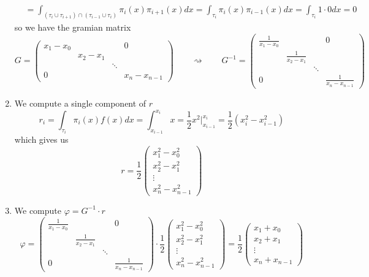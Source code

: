 \begin{enumerate}
\begin{equation*}
\begin{split}
                                           & = \int_{(\tau_i \cup \tau_{i+1}) \cap (\tau_{i-1} \cup \tau_{i})} \pi_i(x) \pi_{i+1}(x)dx = \int_{\tau_i} \pi_i(x) \pi_{i-1}(x) dx = \int_{\tau_i} 1 \cdot 0 dx = 0
         \end{split}
      \end{equation*}
      so we have the gramian matrix
      \[G = \begin{pmatrix} x_1 - x_0 & & & 0\\ & x_2 - x_1 & & \\ & & \ddots  & \\ 0 & & & x_n - x_{n-1}\end{pmatrix} \qquad\rightsquigarrow\qquad G^{-1} = \begin{pmatrix}\frac{1}{x_1 - x_0} & & & 0\\ & \frac{1}{x_2 - x_1} & & \\ & & \ddots & \\0 & & & \frac{1}{x_n - x_{n-1}} \end{pmatrix}\]
   \item We compute a single component of \(r\)
      \[r_i = \int_{\tau_i} \pi_i(x)f(x)dx = \int_{x_{i-1}}^{x_i} x = \frac{1}{2}x^2\rvert_{x_{i-1}}^{x_i} = \frac{1}{2}(x_i^2 - x_{i-1}^2)\]
      which gives us
      \[r = \frac{1}{2}\begin{pmatrix}x_1^2 - x_0^2\\x_2^2-x_1^2\\\vdots\\x_n^2 - x_{n-1}^2\end{pmatrix}\]
   \item We compute \(\varphi = G^{-1} \cdot r\)
      \[\varphi = \begin{pmatrix}\frac{1}{x_1 - x_0} & & & 0\\ & \frac{1}{x_2 - x_1} & & \\ & & \ddots & \\0 & & & \frac{1}{x_n - x_{n-1}} \end{pmatrix}
    \cdot \frac{1}{2} \begin{pmatrix}x_1^2 - x_0^2\\x_2^2 - x_1^2\\\vdots \\x_n^2 - x_{n-1}^2\end{pmatrix}
    = \frac{1}{2} \begin{pmatrix} x_1 + x_0\\x_2 + x_1\\\vdots\\x_n + x_{n-1}\end{pmatrix}\]
\end{enumerate}

